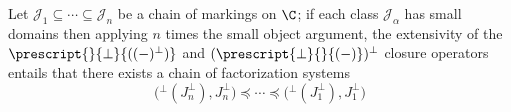 \documentclass[12pt]{amsart}
\begin{document}
\begin{theorem}
Let $\mathcal{J}_1\subseteq \cdots \subseteq \mathcal{J}_n$ be a chain of markings on $\C$; if each class $\mathcal{J}_\alpha$ has small domains then applying $n$ times the small object argument, the extensivity of the $\prescript{}{\perp}{((-)^\perp)}$ and $(\prescript{\perp}{}{(-)})^\perp$ closure operators entails that there exists a chain of factorization systems
\[
\big({}^\perp(J_n^\perp),J_n^\perp \big) \preceq \cdots \preceq \big({}^\perp(J_1^\perp),J_1^\perp \big)
\]
\end{theorem}

\hrulefill
{}

\end{document}
